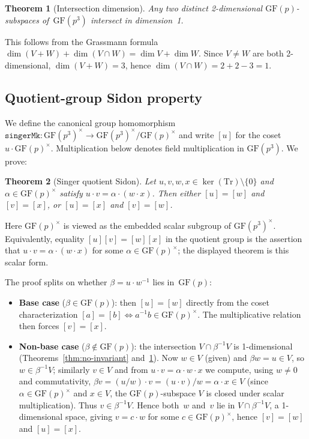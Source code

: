 \documentclass[11pt,a4paper]{article}
\newtheorem{theorem}{Theorem}[section]
\begin{document}
\begin{theorem}[Intersection dimension]
\label{thm:intersection}
Any two distinct 2-dimensional $\mathrm{GF}(p)$-subspaces
of\/~$\mathrm{GF}(p^3)$ intersect in dimension~1.
\end{theorem}

This follows from the Grassmann formula
$\dim(V + W) + \dim(V \cap W) = \dim V + \dim W$.  Since $V \ne W$ are both
2-dimensional, $\dim(V + W) = 3$, hence $\dim(V \cap W) = 2 + 2 - 3 = 1$.

\subsection{Quotient-group Sidon property}

We define the canonical group homomorphism
$\mathtt{singerMk} : \mathrm{GF}(p^3)^\times \to
 \mathrm{GF}(p^3)^\times / \mathrm{GF}(p)^\times$
and write $[u]$ for the coset $u \cdot \mathrm{GF}(p)^\times$.
Multiplication below denotes field multiplication in $\mathrm{GF}(p^3)$.
We prove:

\begin{theorem}[Singer quotient Sidon]
\label{thm:singer-sidon}
Let $u, v, w, x \in \ker(\mathrm{Tr}) \setminus \{0\}$ and $\alpha \in
\mathrm{GF}(p)^\times$ satisfy $u \cdot v = \alpha \cdot (w \cdot x)$.  Then
either $[u] = [w]$ and $[v] = [x]$, or $[u] = [x]$ and $[v] = [w]$.
\end{theorem}

Here \(\mathrm{GF}(p)^\times\) is viewed as the embedded scalar subgroup of
\(\mathrm{GF}(p^3)^\times\).  Equivalently, equality
\([u][v]=[w][x]\) in the quotient group is the assertion that
\(u\cdot v=\alpha\cdot(w\cdot x)\) for some
\(\alpha\in\mathrm{GF}(p)^\times\); the displayed theorem is this scalar form.

The proof splits on whether $\beta = u \cdot w^{-1}$ lies in~$\mathrm{GF}(p)$:
\begin{itemize}[nosep]
  \item \textbf{Base case} ($\beta \in \mathrm{GF}(p)$): then $[u] = [w]$
    directly from the coset characterization $[a] = [b] \iff a^{-1}b \in
    \mathrm{GF}(p)^\times$.  The multiplicative relation then forces $[v] = [x]$.
  \item \textbf{Non-base case} ($\beta \notin \mathrm{GF}(p)$): the
    intersection $V \cap \beta^{-1}V$ is 1-dimensional
    (Theorems~\ref{thm:no-invariant} and~\ref{thm:intersection}).
    Now $w \in V$ (given) and $\beta w = u \in V$, so $w \in \beta^{-1}V$;
    similarly $v \in V$ and from $u \cdot v = \alpha \cdot w \cdot x$ we
    compute, using \(w\ne0\) and commutativity,
    $\beta v = (u/w) \cdot v = (u \cdot v)/w = \alpha \cdot x \in V$
    (since $\alpha \in \mathrm{GF}(p)^\times$ and $x \in V$, the
    $\mathrm{GF}(p)$-subspace $V$ is closed under scalar multiplication).
    Thus $v \in \beta^{-1}V$.  Hence both~$w$ and~$v$
    lie in $V \cap \beta^{-1}V$, a 1-dimensional space, giving $v = c \cdot w$
    for some $c \in \mathrm{GF}(p)^\times$, hence $[v] = [w]$ and $[u] = [x]$.
\end{itemize}
\end{document}
